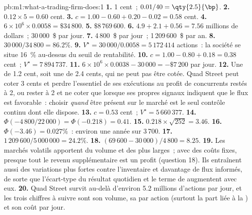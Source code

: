 \begin{solution}{pb:m1:what-a-trading-firm-does:1}
\textbf{1.} 1 cent~; $0.01/40 = \qty{2.5}{\bp}$.
\textbf{2.} $0.12 \times 5 = 0.60$ cent.
\textbf{3.} $c = 1.00 - 0.60 + 0.20 - 0.02 = 0.58$ cent.
\textbf{4.} $6 \times 10^6 \times 0.0058 = \$34\,800$.
\textbf{5.} $\$8\,769\,600$.
\textbf{6.} $4.9 + 2.1 + 0.56 = 7.56$ millions de dollars~; 30\,000~\$ par jour.
\textbf{7.} 4\,800~\$ par jour~; 1\,209\,600~\$ par an.
\textbf{8.} $30\,000/34\,800 = 86.2\%$.
\textbf{9.} $V^\star = 30\,000/0.0058 = 5\,172\,414$ actions~: la société se situe 16~\%
au-dessus du seuil de rentabilité.
\textbf{10.} $c = 1.00 - 0.80 + 0.18 = 0.38$ cent~; $V^\star = 7\,894\,737$.
\textbf{11.} $6 \times 10^6 \times 0.0038 - 30\,000 = -\$7\,200$ par jour.
\textbf{12.} Une  de 1.2 cent, soit une  de 2.4 cents, qui ne
peut pas être cotée. Quad Street peut coter 3 cents et perdre l'essentiel de ses
exécutions au profit de concurrents restés à 2, ou rester à 2 et ne coter que lorsque ses propres signaux
indiquent que le flux est favorable~: choisir \emph{quand} être présent sur le marché est le seul
contrôle continu dont elle dispose.
\textbf{13.} $c = 0.53$ cent~; $V^\star = 5\,660\,377$.
\textbf{14.} $\Phi(-4\,800/22\,000) = \Phi(-0.218) = 0.41$.
\textbf{15.} $0.218 \times \sqrt{252} = 3.46$.
\textbf{16.} $\Phi(-3.46) = 0.027\%$~: environ une année sur 3\,700.
\textbf{17.} $1\,209\,600/5\,000\,000 = 24.2\%$.
\textbf{18.} $(69\,600 - 30\,000)/4\,800 = 8.25$.
\textbf{19.} Les marchés volatils apportent du volume et des  plus larges~; avec
des coûts fixes, presque tout le revenu supplémentaire est un profit (question 18). Ils
entraînent aussi des variations plus fortes contre l'inventaire et davantage de flux informés, de sorte que l'écart-type
du résultat quotidien et le terme de  augmentent avec eux.
\textbf{20.} Quad Street survit au-delà d'environ 5.2 millions d'actions par jour, et
les trois chiffres à suivre sont son volume, sa  par action
(surtout la part liée à la ) et son coût par jour.
\end{solution}

